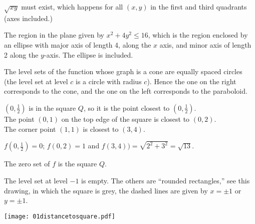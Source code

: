 \item[{\bfseries(III5.11d)}]

$\sqrt{xy}$ must exist, which happens for all $(x,y)$ in the first
and third quadrants (axes included.)
\bigskip

\item[{\bfseries(III5.11f)}]

The region in the plane given by $x^2+4y^2\leq16$, which is the region
enclosed by an ellipse with
major axis of length 4, along the $x$ axis, and minor axis of length
2 along the $y$-axis.  The ellipse is included.
\bigskip

\item[{\bfseries(III5.12)}]

The level sets of the function whose graph is a cone are equally spaced circles
(the level set at level $c$ is a circle with radius $c$).  Hence the one on the
right corresponds to the cone, and
the one on the left corresponds to the paraboloid.
\bigskip

\item[{\bfseries(III5.13a)}]

$(0, \frac{1} {2})$ is in the square $Q$, so it is the point closest to
$(0, \frac{1} {2})$.\\
The point $(0,1)$ on the top edge of the square is closest to $(0,2)$.\\
The corner point $(1,1)$ is closest to $(3,4)$.
\bigskip

\item[{\bfseries(III5.13b)}]

$f(0, \frac12) =0 $;
$f(0,2)=1$ and $f(3, 4))=\sqrt{2^2+3^2}=\sqrt{13}$.
\bigskip

\item[{\bfseries(III5.13c)}]

The zero set of $f$ is the square $Q$.
\bigskip

\item[{\bfseries(III5.13d)}]

The level set at level $-1$ is empty.  The others are ``rounded
rectangles,'' see this drawing, in which the square is grey, the dashed
lines are given by $x=\pm1$ or $y=\pm1$.
\begin{center}
    \texttt{[image: 01distancetosquare.pdf]}
\end{center}
\bigskip

\item[{\bfseries(III5.13e)}]


